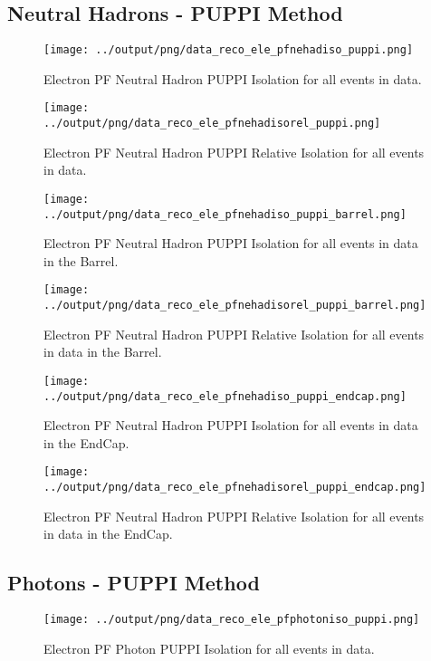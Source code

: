\documentclass[11pt]{book}
\begin{document}
\subsection{Neutral Hadrons - PUPPI Method}
\begin{figure}[htb]
\centering
\texttt{[image: ../output/png/data\_reco\_ele\_pfnehadiso\_puppi.png]}
\caption{Electron PF Neutral Hadron PUPPI Isolation for all events in data.}
\label{fig:data_ele_pfnehadiso_puppi}
\end{figure}

\begin{figure}[htb]
\centering
\texttt{[image: ../output/png/data\_reco\_ele\_pfnehadisorel\_puppi.png]}
\caption{Electron PF Neutral Hadron PUPPI Relative Isolation for all events in data.}
\label{fig:data_ele_pfnehadisorel_puppi}
\end{figure}

\begin{figure}[htb]
\centering
\texttt{[image: ../output/png/data\_reco\_ele\_pfnehadiso\_puppi\_barrel.png]}
\caption{Electron PF Neutral Hadron PUPPI Isolation for all events in data in the Barrel.}
\label{fig:data_ele_pfnehadiso_puppi_barrel}
\end{figure}

\begin{figure}[htb]
\centering
\texttt{[image: ../output/png/data\_reco\_ele\_pfnehadisorel\_puppi\_barrel.png]}
\caption{Electron PF Neutral Hadron PUPPI Relative Isolation for all events in data in the Barrel.}
\label{fig:data_ele_pfnehadisorel_puppi_barrel}
\end{figure}

\begin{figure}[htb]
\centering
\texttt{[image: ../output/png/data\_reco\_ele\_pfnehadiso\_puppi\_endcap.png]}
\caption{Electron PF Neutral Hadron PUPPI Isolation for all events in data in the EndCap.}
\label{fig:data_ele_pfnehadiso_puppi_endcap}
\end{figure}

\begin{figure}[htb]
\centering
\texttt{[image: ../output/png/data\_reco\_ele\_pfnehadisorel\_puppi\_endcap.png]}
\caption{Electron PF Neutral Hadron PUPPI Relative Isolation for all events in data in the EndCap.}
\label{fig:data_ele_pfnehadisorel_puppi_endcap}
\end{figure}
\clearpage

\subsection{Photons - PUPPI Method}
\begin{figure}[htb]
\centering
\texttt{[image: ../output/png/data\_reco\_ele\_pfphotoniso\_puppi.png]}
\caption{Electron PF Photon PUPPI Isolation for all events in data.}
\label{fig:data_ele_pfphotoniso_puppi}
\end{figure}
\end{document}
